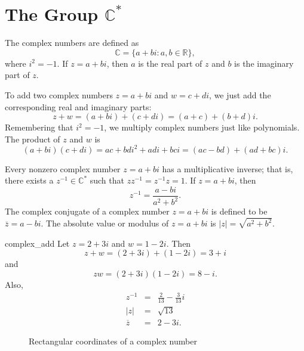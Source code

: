  
\section{The Group ${\mathbb C}^\ast$}
 
 
The {\bfi complex numbers} are defined as
\[
{\mathbb C} = \{ a + bi : a, b \in {\mathbb R} \},
\]
where $i^2 = -1$.  If $z=a+bi$, then $a$ is the {\bfi real part} of $z$
and $b$ is the {\bfi imaginary part} of $z$. 
 
 
To add two complex numbers $z=a+bi$ and $w= c+di$, we just
add the corresponding real and imaginary parts:
\[
z+w=(a + bi ) + (c + di)  =  (a+c) + (b+d)i.
\]
Remembering that $i^2 = -1$,  we multiply complex numbers just like
polynomials. The product of $z$ and $w$ is 
\[
(a + bi )(c + di)  =   ac + bdi^2 + adi + bci =  (ac -bd) +
(ad + bc)i.
\]
 
 
Every nonzero complex number $z = a +bi$ has a multiplicative inverse;
that is, there exists a $z^{-1} \in {\mathbb C}^\ast$ such that $z z^{-1}
= z^{-1} z = 1$. If $z = a + bi$, then 
\[
z^{-1} = \frac{a-bi}{ a^2 + b^2  }.
\]
The {\bfi complex conjugate} of a complex
number $z = a +bi$ is defined to be $\overline{z} = a-bi$.  The {\bfi
absolute value} or {\bfi modulus} of  $z = a +bi$  is $|z| =
\sqrt{a^2+b^2}$.  
 
 
\begin{example}{complex_add}
Let $z = 2 + 3i$ and $w = 1-2i$. Then
\[
z + w = (2 + 3i)+( 1-2i ) = 3 +i
\]
and
\[
z  w = (2 + 3i)( 1-2i ) = 8-i.
\]
Also,
\begin{eqnarray*}
z^{-1} & = & \frac{2}{13} - \frac{3}{13}i \\
|z| & = & \sqrt{13} \\
\overline{z} & = & 2-3i.
\end{eqnarray*}
\end{example}
 
\begin{figure}[hbt]  %
\begin{center}
\end{center}
\caption{Rectangular coordinates of a complex number}
\label{rectcoord}
\end{figure}
 
